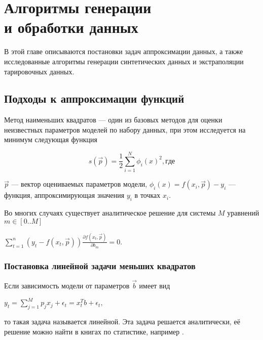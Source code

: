 \chapter[Алгоритмы генерации и обработки данных]{Алгоритмы генерации \\ и обработки данных} \label{chapt2}

В этой главе описываются постановки задач аппроксимации данных, а также исследованные алгоритмы генерации 
синтетических данных и
экстраполяции тарировочных данных. 


\section{Подходы к аппроксимации функций}\label{sect2_1}
Метод наименьших квадратов --- один из базовых методов для оценки неизвестных 
параметров моделей по набору данных, при этом исследуется на минимум
следующая функция

\begin{equation}
\label{eq:square_minimum}
s(\vec{p}) = \frac{1}{2} \displaystyle \sum_{i=1}^N \phi_i(x)^2 , где
\end{equation}




$\vec{p}$ --- вектор оцениваемых параметров модели, $\phi_i(x) = f(x_i, \vec{p}) - y_i $
--- функция, аппроксимирующая значения $y_i$ в точках $x_i$.

Во многих случаях существует аналитическое решение для системы $M$ уравнений 
$m \in [0..M]$
\begin{center}
 $ \displaystyle\sum_{t = 1}^n \left( y_t - f(x_t,\vec{p})\right) 
 \frac{\partial f(x_t, \vec{p})}{\partial b_m} = 0.$
\end{center}

\subsection{Постановка линейной задачи меньших квадратов}

Если зависимость модели от параметров $\vec{b}$ имеет вид 

\begin{center}
$ y_t = \displaystyle\sum_{j=1}^{M}p_j x_j + \epsilon_t = 
x^T_tb + \epsilon_t, $ 
\end{center}
 то такая задача называется линейной. Эта задача решается аналитически, 
её решение можно найти в книгах по статистике, например \cite{linnik}.



